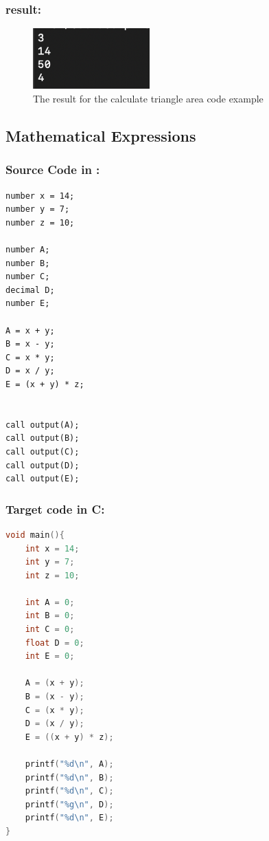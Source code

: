 \subsubsection{result:}
\begin{figure}[H] 
    \begin{center}
        \includegraphics[width=0.40\textwidth]{Files/Billeder: Appendix/TriangleCalc.png}
    \end{center}
    \caption{The result for the calculate triangle area code example}
    \label{figure:triangleArea_result}
\end{figure}

\subsection{Mathematical Expressions} \label{test_MathExpr}

\subsubsection{Source Code in \lang:}
\begin{lstlisting}[language = scriptkid, firstnumber=1, label={list:acceptance_test_mathexpr}, caption=Acceptance test math expressions code examples]
number x = 14;
number y = 7;
number z = 10;

number A;
number B;
number C;
decimal D;
number E;

A = x + y;
B = x - y;
C = x * y;
D = x / y;
E = (x + y) * z;


call output(A);
call output(B);
call output(C);
call output(D);
call output(E);
\end{lstlisting}

\subsubsection{Target code in C:}
\begin{lstlisting}[language = C, firstnumber=1, label={list:acceptance_test_mathexpr_output}, caption=Acceptance test math expressions code examples in C]
void main(){
    int x = 14;
    int y = 7;
    int z = 10;
 
    int A = 0;
    int B = 0;
    int C = 0;
    float D = 0;
    int E = 0;
 
    A = (x + y);
    B = (x - y);
    C = (x * y);
    D = (x / y);
    E = ((x + y) * z);
 
    printf("%d\n", A);
    printf("%d\n", B);
    printf("%d\n", C);
    printf("%g\n", D);
    printf("%d\n", E);
}
\end{lstlisting}

